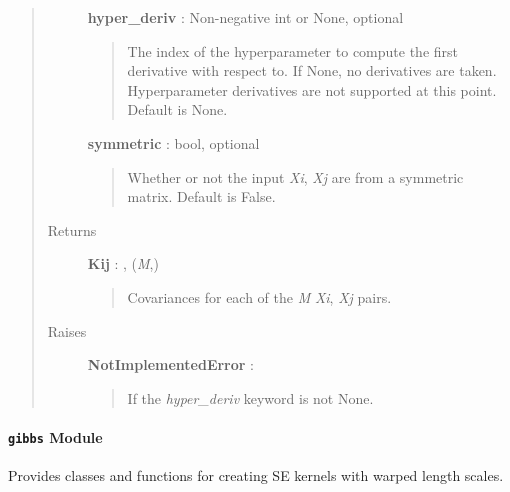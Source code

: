 \documentclass[letterpaper,10pt,english]{sphinxmanual}
\begin{document}
\begin{fulllineitems}
\begin{fulllineitems}
\begin{quote}
\begin{description}
\textbf{hyper\_deriv} : Non-negative int or None, optional
\begin{quote}

The index of the hyperparameter to compute the first derivative
with respect to. If None, no derivatives are taken. Hyperparameter
derivatives are not supported at this point. Default is None.
\end{quote}

\textbf{symmetric} : bool, optional
\begin{quote}

Whether or not the input \emph{Xi}, \emph{Xj} are from a symmetric matrix.
Default is False.
\end{quote}

\item[{Returns }] \leavevmode
\textbf{Kij} : , (\emph{M},)
\begin{quote}

Covariances for each of the \emph{M} \emph{Xi}, \emph{Xj} pairs.
\end{quote}

\item[{Raises }] \leavevmode
\textbf{NotImplementedError} :
\begin{quote}

If the \emph{hyper\_deriv} keyword is not None.
\end{quote}

\end{description}\end{quote}

\end{fulllineitems}


\end{fulllineitems}



\paragraph{\texttt{gibbs} Module}
\label{gptools.kernel:module-gptools.kernel.gibbs}\label{gptools.kernel:gibbs-module}
Provides classes and functions for creating SE kernels with warped length scales.
\end{document}
